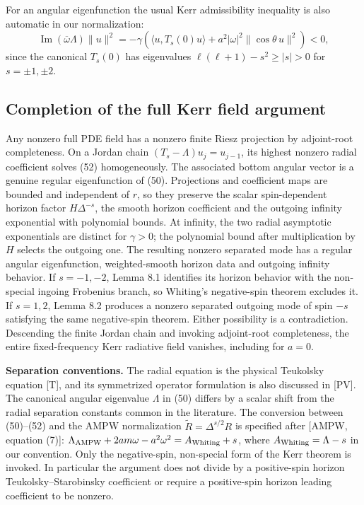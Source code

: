 \documentclass[
  10pt,
  a4paper,
]{article}
\begin{document}
For an angular eigenfunction the usual Kerr admissibility inequality is
also automatic in our normalization: \[
 \operatorname{Im}(\overline\omega\Lambda)\|u\|^2
 =-\gamma\left(\langle u,T_s(0)u\rangle
             +a^2|\omega|^2\|\cos\theta\,u\|^2\right)<0,
 \tag{59}
\] since the canonical \(T_s(0)\) has eigenvalues
\(\ell(\ell+1)-s^2\ge |s|>0\) for \(s=\pm1,\pm2\).

\subsection{Completion of the full Kerr field
argument}\label{completion-of-the-full-kerr-field-argument}

Any nonzero full PDE field has a nonzero finite Riesz projection by
adjoint-root completeness. On a Jordan chain
\((T_s-\Lambda)u_j=u_{j-1}\), its highest nonzero radial coefficient
solves (52) homogeneously. The associated bottom angular vector is a
genuine regular eigenfunction of (50). Projections and coefficient maps
are bounded and independent of \(r\), so they preserve the scalar
spin-dependent horizon factor \(H\Delta^{-s}\), the smooth horizon
coefficient and the outgoing infinity exponential with polynomial
bounds. At infinity, the two radial asymptotic exponentials are distinct
for \(\gamma>0\); the polynomial bound after multiplication by \(H\)
selects the outgoing one. The resulting nonzero separated mode has a
regular angular eigenfunction, weighted-smooth horizon data and outgoing
infinity behavior. If \(s=-1,-2\), Lemma 8.1 identifies its horizon
behavior with the non-special ingoing Frobenius branch, so Whiting's
negative-spin theorem excludes it. If \(s=1,2\), Lemma 8.2 produces a
nonzero separated outgoing mode of spin \(-s\) satisfying the same
negative-spin theorem. Either possibility is a contradiction. Descending
the finite Jordan chain and invoking adjoint-root completeness, the
entire fixed-frequency Kerr radiative field vanishes, including for
\(a=0\).

\textbf{Separation conventions.} The radial equation is the physical
Teukolsky equation {[}T{]}, and its symmetrized operator formulation is
also discussed in {[}PV{]}. The canonical angular eigenvalue \(\Lambda\)
in (50) differs by a scalar shift from the radial separation constants
common in the literature. The conversion between (50)--(52) and the AMPW
normalization \(\widetilde R=\Delta^{s/2}R\) is specified after {[}AMPW,
equation (7){]}:
\(\Lambda_{\rm AMPW}+2am\omega-a^2\omega^2=A_{\rm Whiting}+s\), where
\(A_{\rm Whiting}=\Lambda-s\) in our convention. Only the negative-spin,
non-special form of the Kerr theorem is invoked. In particular the
argument does not divide by a positive-spin horizon
Teukolsky--Starobinsky coefficient or require a positive-spin horizon
leading coefficient to be nonzero.
\end{document}
